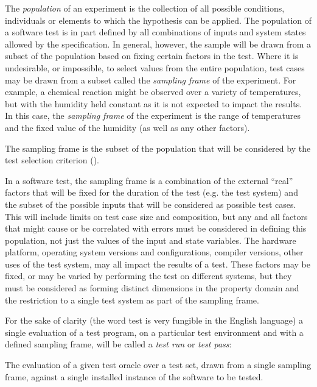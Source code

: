 The \emph{population} of an experiment is
the collection of all possible conditions, individuals or elements
to which the hypothesis can be applied.
The population of a software test is in part defined by
all combinations of inputs and system states allowed by the specification.
In general, however, the sample will be drawn from
a subset of the population based on fixing certain factors in the test.
Where it is undesirable, or impossible, to select values from the entire population,
test cases may be drawn from a subset called the \emph{sampling frame} of the experiment.
For example,
a chemical reaction might be observed over a variety of temperatures,
but with the humidity held constant as it is not expected to impact the results.
In this case, 
the \emph{sampling frame} of the experiment 
is the range of temperatures and the fixed value of the humidity (as well as any other factors).
\begin{df}
The sampling frame is the subset of the population
that will be considered by the test selection criterion (\cite{Stuart1968}).
\end{df}

In a software test,
the sampling frame is a combination of the external ``real'' factors that will be fixed for the duration of the test
(e.g. the test system) and the subset of the possible inputs that will be considered as possible test cases.
This will include limits on test case size and composition,
but any and all factors that might cause or be correlated with errors
must be considered in defining this population,
not just the values of the input and state variables.
The hardware platform, operating system versions and configurations,
compiler versions, other uses of the test system,
may all impact the results of a test.
These factors may be fixed, 
or may be varied by performing the test on different systems,
but they must be considered as forming distinct dimensions in the property domain
and the restriction to a single test system as part of the sampling frame.

For the sake of clarity (the word test is very fungible in the English language)
a single evaluation of a test program,
on a particular test environment and with a defined sampling frame,
will be called a \emph{test run} or \emph{test pass}:

\begin{df}
The evaluation of a given test oracle over a test set,
drawn from a single sampling frame,
against a single installed instance of the software to be tested.
\end{df}

